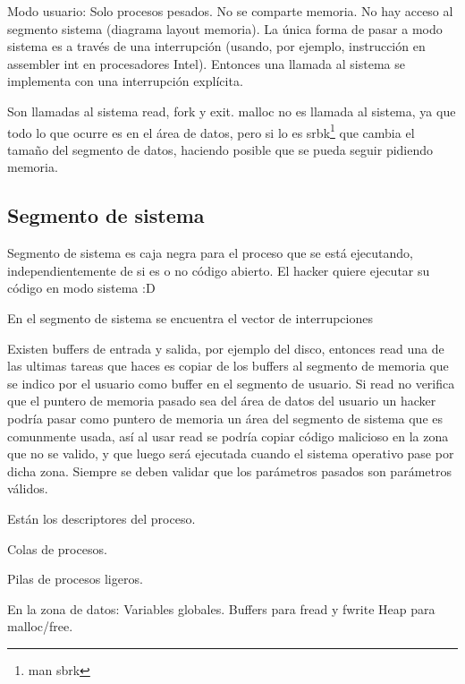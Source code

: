 Modo usuario:
Solo procesos pesados.
No se comparte memoria.
No hay acceso al segmento sistema (diagrama layout memoria).
La única forma de pasar a modo sistema es a través de una interrupción (usando, por ejemplo, instrucción en assembler int en procesadores Intel).
Entonces una llamada al sistema se implementa con una interrupción explícita.


Son llamadas al sistema read, fork y exit. malloc no es llamada al sistema, ya que todo lo que ocurre es en el área de datos, pero si lo es srbk\footnote{man sbrk} que cambia el tamaño del segmento de datos, haciendo posible que se pueda seguir pidiendo memoria.

\subsection{Segmento de sistema}

Segmento de sistema es caja negra para el proceso que se está ejecutando, independientemente de si es o no código abierto. El hacker quiere ejecutar su código en modo sistema :D

En el segmento de sistema se encuentra el vector de interrupciones

Existen buffers de entrada y salida, por ejemplo del disco, entonces read una de las ultimas tareas que haces es copiar de los buffers al segmento de memoria que se indico por el usuario como buffer en el segmento de usuario. Si read no verifica que el puntero de memoria pasado sea del área de datos del usuario un hacker podría pasar como puntero de memoria un área del segmento de sistema que es comunmente usada, así al usar read se podría copiar código malicioso en la zona que no se valido, y que luego será ejecutada cuando el sistema operativo pase por dicha zona. Siempre se deben validar que los parámetros pasados son parámetros válidos.

Están los descriptores del proceso.

Colas de procesos.

Pilas de procesos ligeros. %

En la zona de datos:
Variables globales.
Buffers para fread y fwrite
Heap para malloc/free.

